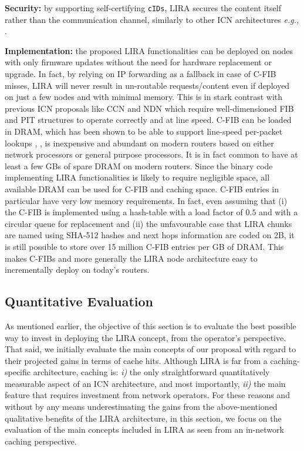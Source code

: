 \documentclass{sig-alternate}
\newcommand{\eg}{{\em e.g.,\/ }}
\begin{document}
\textbf{Security:}
by supporting self-certifying \texttt{cIDs}, LIRA secures the content itself rather than the communication channel, similarly to other ICN architectures \eg \cite{ccn}.

\textbf{Implementation:}
the proposed LIRA functionalities can be deployed on nodes with only firmware updates without the need for hardware replacement or upgrade.
In fact, by relying on IP forwarding as a fallback in case of C-FIB misses, LIRA will never result in un-routable requests/content even if deployed on just a few nodes and with minimal memory.
This is in stark contrast with previous ICN proposals like CCN and NDN which require well-dimensioned FIB and PIT structures to operate correctly and at line speed.
C-FIB can be loaded in DRAM, which has been shown to be able to support line-speed per-packet lookups \cite{cuckooswitch-conext13}, \cite{caesar-ancs14}, is inexpensive and abundant on modern routers based on either network processors or general purpose processors.
It is in fact common to have at least a few GBs of spare DRAM on modern routers.
Since the binary code implementing LIRA functionalities is likely to require negligible space, all available DRAM can be used for C-FIB and caching space. C-FIB entries in particular have very low memory requirements. 
In fact, even assuming that (i) the C-FIB is implemented using a hash-table with a load factor of $0.5$ and with a circular queue for replacement and (ii) the unfavourable case that LIRA chunks are named using SHA-512 hashes and next hops information are coded on 2B, it is still possible to store over 15 million C-FIB entries per GB of DRAM.
This makes C-FIBs and more generally the LIRA node architecture easy to incrementally deploy on today's routers.



\subsection{Quantitative Evaluation}
\label{quantitative-eval}

As mentioned earlier, the objective of this section is to evaluate the best possible way to invest in 
deploying the LIRA concept, from the operator's perspective. That said, we initially evaluate the main 
concepts of our proposal with regard to their projected gains in terms of cache hits. 
Although LIRA is far from a caching-specific architecture, caching is: \textit{i)} the only 
straightforward quantitatively measurable aspect of an ICN architecture, and most importantly, \textit{ii)} 
the main feature that requires investment from network operators. For these reasons and without by any 
means underestimating the gains from the above-mentioned qualitative benefits of the LIRA 
architecture, in this section, we focus on the evaluation of the main concepts included in LIRA as seen 
from an in-network caching perspective.
\end{document}
